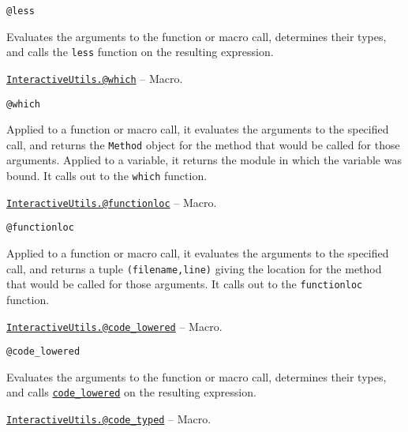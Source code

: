 \begin{adjustwidth}{2em}{0pt}


\begin{verbatim}
@less
\end{verbatim}

Evaluates the arguments to the function or macro call, determines their types, and calls the \texttt{less} function on the resulting expression.



\end{adjustwidth}
\hypertarget{5196080466457876497}{}
\hyperlink{5196080466457876497}{\texttt{InteractiveUtils.@which}}  -- {Macro.}

\begin{adjustwidth}{2em}{0pt}


\begin{verbatim}
@which
\end{verbatim}

Applied to a function or macro call, it evaluates the arguments to the specified call, and returns the \texttt{Method} object for the method that would be called for those arguments. Applied to a variable, it returns the module in which the variable was bound. It calls out to the \texttt{which} function.



\end{adjustwidth}
\hypertarget{12812718888833665191}{}
\hyperlink{12812718888833665191}{\texttt{InteractiveUtils.@functionloc}}  -- {Macro.}

\begin{adjustwidth}{2em}{0pt}


\begin{verbatim}
@functionloc
\end{verbatim}

Applied to a function or macro call, it evaluates the arguments to the specified call, and returns a tuple \texttt{(filename,line)} giving the location for the method that would be called for those arguments. It calls out to the \texttt{functionloc} function.



\end{adjustwidth}
\hypertarget{1376948972689074219}{}
\hyperlink{1376948972689074219}{\texttt{InteractiveUtils.@code\_lowered}}  -- {Macro.}

\begin{adjustwidth}{2em}{0pt}


\begin{verbatim}
@code_lowered
\end{verbatim}

Evaluates the arguments to the function or macro call, determines their types, and calls \hyperlink{18235967286596219009}{\texttt{code\_lowered}} on the resulting expression.



\end{adjustwidth}
\hypertarget{6823997547688846780}{}
\hyperlink{6823997547688846780}{\texttt{InteractiveUtils.@code\_typed}}  -- {Macro.}

